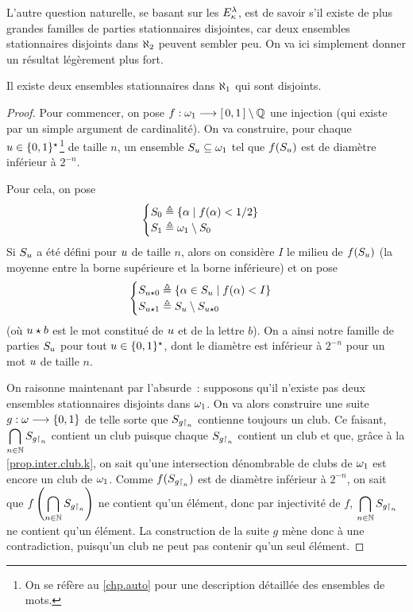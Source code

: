 L'autre question naturelle, se basant sur les $E_{\kappa}^{\lambda}$, est de
savoir s'il existe de plus grandes familles de parties stationnaires disjointes,
car deux ensembles stationnaires disjoints dans $\aleph_2$ peuvent sembler peu. On
va ici simplement donner un résultat légèrement plus fort.

\begin{proposition}\label{prop.al1.deuxdis}
  Il existe deux ensembles stationnaires dans $\aleph_1$ qui sont disjoints.
\end{proposition}

\begin{proof}
  Pour commencer, on pose $f : \displaystyle \omega_1 \longrightarrow \mathord{\left[\,0,1\,\right]}\setminus \mathbb Q$
  une injection (qui existe par un simple argument de cardinalité). On va
  construire, pour chaque $u \in \{0,1\}^{\star}$\footnote{On se réfère au
  \cref{chp.auto} pour une description détaillée des ensembles de mots.}
  de taille $n$, un ensemble
  $S_{u}\subseteq \omega_1$ tel que $f(S_{u})$ est de diamètre
  inférieur à $2^{-n}$.

  Pour cela, on pose
  \[\begin{cases}
  S_0 \triangleq \left\{ \alpha \;\middle\vert\; f(\alpha) < 1/2 \right\}\\
  S_1 \triangleq \omega_1\setminus S_0
  \end{cases}\]
  Si $S_{u}$ a été défini pour $u$ de taille $n$, alors on
  considère $I$ le milieu de $f(S_{u})$
  (la moyenne entre la borne supérieure et la borne inférieure) et on pose
  \[\begin{cases}
  S_{u\mathbin{\star} 0} \triangleq \left\{ \alpha \in S_{u} \;\middle\vert\; f(\alpha) < I \right\}\\
  S_{u\mathbin{\star} 1} \triangleq S_u \setminus S_{u\mathbin{\star} 0}
  \end{cases}\]
  (où $u\mathbin{\star} b$ est le mot constitué de $u$ et de la lettre $b$).
  On a ainsi notre famille de parties $S_u$ pour tout
  $u \in \{0,1\}^{\star}$, dont le diamètre est inférieur à $2^{-n}$ pour un
  mot $u$ de taille $n$.

  On raisonne maintenant par l'absurde~: supposons qu'il n'existe pas deux
  ensembles stationnaires disjoints dans $\omega_1$. On va alors construire une
  suite $g : \displaystyle \omega \longrightarrow \{0,1\}$ de telle sorte que $S_{g\mathbin{\upharpoonright}_{n}}$
  contienne toujours un club. Ce faisant,
  $\displaystyle\bigcap_{n\in \mathbb N} S_{g\mathbin{\upharpoonright}_{n}}$
  contient un club puisque chaque $S_{g\mathbin{\upharpoonright}_{n}}$ contient un club et que,
  grâce à la \cref{prop.inter.club.k}, on sait qu'une intersection dénombrable
  de clubs de $\omega_1$ est encore un club de $\omega_1$. Comme
  $f(S_{g\mathbin{\upharpoonright}_{n}})$ est de diamètre inférieur à $2^{-n}$, on sait que
  $\displaystyle f\left(\bigcap_{n \in \mathbb N} S_{g\mathbin{\upharpoonright}_{n}}\right)$
  ne contient qu'un élément, donc par injectivité de $f$,
  $\displaystyle \bigcap_{n \in \mathbb N} S_{g\mathbin{\upharpoonright}_{n}}$ ne contient qu'un élément.
  La construction de la suite $g$ mène donc à une contradiction, puisqu'un
  club ne peut pas contenir qu'un seul élément.


\end{proof}
